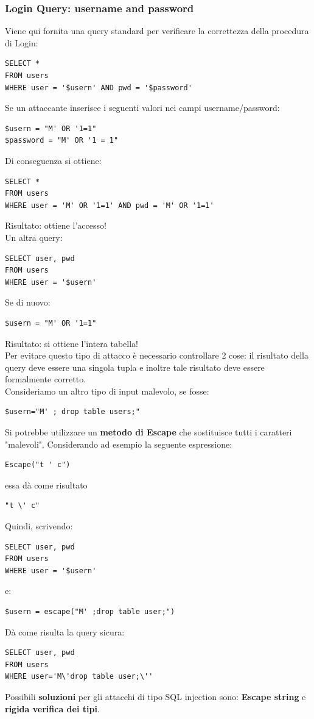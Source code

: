 \subsubsection{Login Query: username and password} 
Viene qui fornita una query standard per verificare la correttezza della procedura di Login:
\begin{lstlisting}
SELECT * 
FROM users 
WHERE user = '$usern' AND pwd = '$password'
\end{lstlisting}
Se un attaccante inserisce i seguenti valori nei campi username/password:
\begin{lstlisting}
$usern = "M' OR '1=1"
$password = "M' OR '1 = 1"
\end{lstlisting}
Di conseguenza si ottiene:
\begin{lstlisting}
SELECT * 
FROM users 
WHERE user = 'M' OR '1=1' AND pwd = 'M' OR '1=1'
\end{lstlisting}
Risultato: ottiene l'accesso!\\
Un altra query:
\begin{lstlisting}
SELECT user, pwd 
FROM users 
WHERE user = '$usern' 
\end{lstlisting}
Se di nuovo:
\begin{lstlisting}
$usern = "M' OR '1=1" 
\end{lstlisting}
Risultato: si ottiene l'intera tabella!\\
Per evitare questo tipo di attacco è necessario controllare 2 cose: il risultato della query deve essere una singola tupla e inoltre tale risultato deve essere formalmente corretto. \\
\linebreak
Consideriamo un altro tipo di input malevolo, se fosse:  
\begin{lstlisting} 
$usern="M' ; drop table users;"
\end{lstlisting}
Si potrebbe utilizzare un \textbf{metodo di Escape} che sostituisce tutti i caratteri "malevoli".
Considerando ad esempio la seguente espressione:
\begin{lstlisting} 
Escape("t ' c") 
\end{lstlisting}
essa dà come risultato
\begin{lstlisting} 
"t \' c"
\end{lstlisting}
Quindi, scrivendo:
\begin{lstlisting} 
SELECT user, pwd 
FROM users 
WHERE user = '$usern'
\end{lstlisting}
e:
\begin{lstlisting} 
$usern = escape("M' ;drop table user;")
\end{lstlisting}
Dà come risulta la query sicura:
\begin{lstlisting} 
SELECT user, pwd 
FROM users 
WHERE user='M\'drop table user;\''
\end{lstlisting}
Possibili \textbf{soluzioni} per gli attacchi di tipo SQL injection sono: \textbf{Escape string} e \textbf{rigida verifica dei tipi}.
